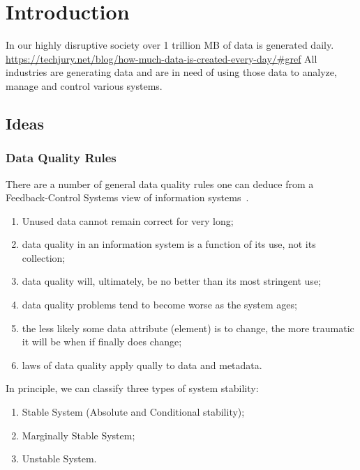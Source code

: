 \chapter{Introduction}\label{ch:introduction}

In our highly disruptive society over 1 trillion MB of data is generated daily. \url{https://techjury.net/blog/how-much-data-is-created-every-day/#gref}
All industries are generating data and are in need of using those data to analyze, manage and control various systems.

\section{Ideas}

\subsection{Data Quality Rules}

There are a number of general data quality rules one can deduce from a Feedback-Control Systems view of information systems~\cite{10.1145/269012.269023}.

\begin{enumerate}
    \item Unused data cannot remain correct for very long;
    \item data quality in an information system is a function of its use, not its collection;
    \item data quality will, ultimately, be no better than its most stringent use;
    \item data quality problems tend to become worse as the system ages;
    \item the less likely some data attribute (element) is to change, the more traumatic it will be when if finally does change;
    \item laws of data quality apply qually to data and metadata.
\end{enumerate}

\noindent In principle, we can classify three types of system stability:

\begin{enumerate}
    \item Stable System (Absolute and Conditional stability);
    \item Marginally Stable System;
    \item Unstable System.
\end{enumerate}

